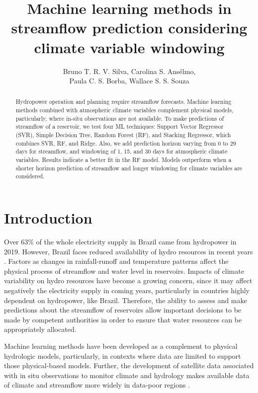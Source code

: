 \documentclass[12pt]{article}
\title{Machine learning methods in streamflow prediction  considering climate variable windowing}
\author{%
    Bruno T. R. V. Silva\inst{1}, %
    Carolina S. Ansélmo\inst{1}, \\%
    Paula C. S. Borba\inst{1}, %
    Wallace S. S. Souza\inst{1}%
}
\begin{document}
\maketitle

\begin{abstract}
Hydropower operation and planning require streamflow forecasts. Machine learning methods combined with atmospheric climate variables complement physical models, particularly, where in-situ observations are not available. To make predictions of streamflow of a reservoir, we test four ML techniques: Support Vector Regressor (SVR), Simple Decision Tree, Random Forest (RF), and Stacking Regressor, which combines SVR, RF, and Ridge. Also, we add prediction horizon varying from 0 to 29 days for streamflow, and windowing of 1, 15, and 30 days for atmospheric climate variables. Results indicate a better fit in the RF model. Models outperform when a shorter horizon prediction of streamflow and longer windowing for climate variables are considered.

\end{abstract}


\section{Introduction}

Over 63\% of the whole electricity supply in Brazil came from hydropower in 2019. However, Brazil faces reduced availability of hydro resources in recent years \cite{onsseca}. Factors as changes in rainfall-runoff and temperature patterns affect the physical process of streamflow and water level in reservoirs. Impacts of climate variability on hydro resources have become a growing concern, since it may affect negatively the electricity supply in coming years, particularly in countries highly dependent on hydropower, like Brazil. Therefore, the ability to assess and make predictions about the streamflow of reservoirs allow important decisions to be made by competent authorities in order to ensure that water resources can be appropriately allocated.

Machine learning methods have been developed as a complement to physical hydrologic models, particularly, in contexts where data are limited to support those physical-based models. Further, the development of satellite data associated with in situ observations to monitor climate and hydrology makes available data of climate and streamflow more widely in data-poor regions \cite{julie}.
\end{document}
